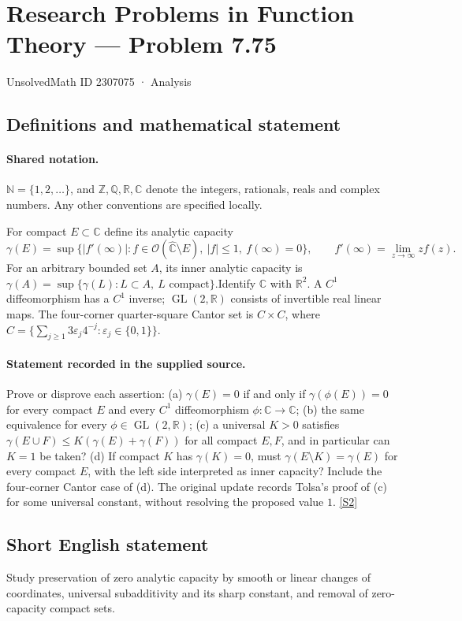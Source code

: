 \documentclass[11pt]{article}
\newcommand{\sref}[2]{\hyperlink{source:#1:#2}{[S#2]}}
\begin{document}
\setcounter{section}{2307074}
\section{Research Problems in Function Theory — Problem 7.75}\label{2307075}
{\small\sffamily UnsolvedMath ID 2307075 · Analysis}
\subsection{Definitions and mathematical statement}

\paragraph{Shared notation.}$\mathbb N=\{1,2,\ldots\}$, and $\mathbb Z,\mathbb Q,\mathbb R,\mathbb C$ denote the integers, rationals, reals and complex numbers. Any other conventions are specified locally.


For compact $E\subset\mathbb C$ define its analytic capacity
\[\gamma(E)=\sup\{|f'(\infty)|: f\in\mathcal O(\widehat{\mathbb C}\setminus E),\ |f|\le1,\ f(\infty)=0\},
\qquad f'(\infty)=\lim_{z\to\infty}zf(z).
\]
For an arbitrary bounded set $A$, its inner analytic capacity is $\gamma(A)=\sup\{\gamma(L):L\subset A,\ L\text{ compact}\}$.Identify $\mathbb C$ with $\mathbb R^2$. A $C^1$ diffeomorphism has a $C^1$ inverse; $\operatorname{GL}(2,\mathbb R)$ consists of invertible real linear maps. The four-corner quarter-square Cantor set is $C\times C$, where $C=\{\sum_{j\ge1}3\varepsilon_j4^{-j}:\varepsilon_j\in\{0,1\}\}$.
\paragraph{Statement recorded in the supplied source.}
Prove or disprove each assertion: (a) $\gamma(E)=0$ if and only if $\gamma(\phi(E))=0$ for every compact $E$ and every $C^1$ diffeomorphism $\phi:\mathbb C\to\mathbb C$; (b) the same equivalence for every $\phi\in\operatorname{GL}(2,\mathbb R)$; (c) a universal $K>0$ satisfies $\gamma(E\cup F)\le K(\gamma(E)+\gamma(F))$ for all compact $E,F$, and in particular can $K=1$ be taken? (d) If compact $K$ has $\gamma(K)=0$, must $\gamma(E\setminus K)=\gamma(E)$ for every compact $E$, with the left side interpreted as inner capacity? Include the four-corner Cantor case of (d). The original update records Tolsa's proof of (c) for some universal constant, without resolving the proposed value $1$. \sref{2307075}{2}
\subsection{Short English statement}
Study preservation of zero analytic capacity by smooth or linear changes of coordinates, universal subadditivity and its sharp constant, and removal of zero-capacity compact sets.
\end{document}
